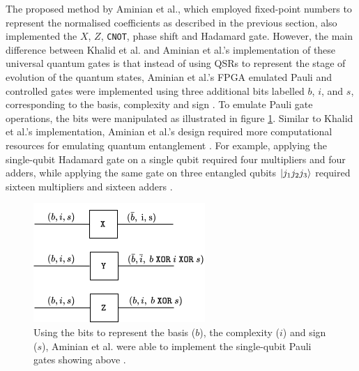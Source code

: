 The proposed method by Aminian et al., which employed fixed-point numbers to represent the normalised coefficients as described in the previous section, also implemented the $X$, $Z$, \texttt{CNOT}, phase shift and Hadamard gate. However, the main difference between Khalid et al. and Aminian et al.'s implementation of these universal quantum gates is that instead of using QSRs to represent the stage of evolution of the quantum states, Aminian et al.'s FPGA emulated Pauli and controlled gates were implemented using three additional bits labelled $b$, $i$, and $s$, corresponding to the basis, complexity and sign \cite{Aminian2008}. To emulate Pauli gate operations, the bits were manipulated as illustrated in figure \ref{fig:aminian-pauli-gates}. Similar to Khalid et al.'s implementation, Aminian et al.'s design required more computational resources for emulating quantum entanglement \cite{Aminian2008, Khalid2004}. For example, applying the single-qubit Hadamard gate on a single qubit required four multipliers and four adders, while applying the same gate on three entangled qubits $\ket{j_1 j_2 j_3}$ required sixteen multipliers and sixteen adders \cite{Aminian2008}. 
\begin{figure}[!ht]
	\centering
	\includegraphics[width=0.75\linewidth]{body/ch3/figs/aminian-pauli-gates}
	\caption[Implementation of Paul-$X$, $Y$, and $Z$ Gates by Aminian et al.]{Using the bits to represent the basis ($b$), the complexity ($i$) and sign ($s$), Aminian et al. were able to implement the single-qubit Pauli gates showing above \cite{Aminian2008}.}
	\label{fig:aminian-pauli-gates}
\end{figure}

